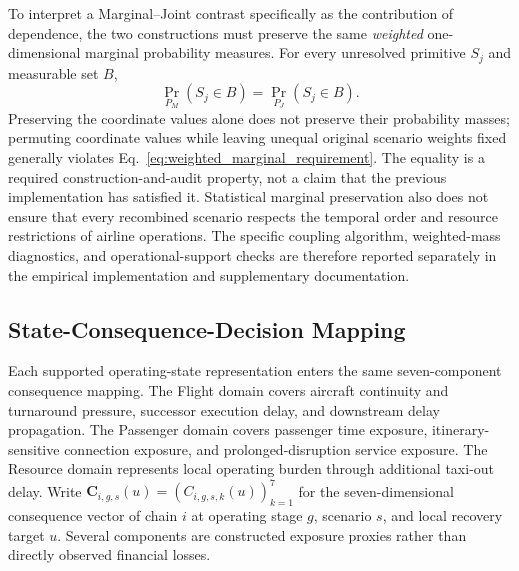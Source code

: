 To interpret a Marginal--Joint contrast specifically as the contribution of dependence, the two constructions must preserve the same \emph{weighted} one-dimensional marginal probability measures. For every unresolved primitive $S_j$ and measurable set $B$,
\begin{equation}
\Pr_{P_M}(S_j\in B)=\Pr_{P_J}(S_j\in B).
\label{eq:weighted_marginal_requirement}
\end{equation}
Preserving the coordinate values alone does not preserve their probability masses; permuting coordinate values while leaving unequal original scenario weights fixed generally violates Eq.~\eqref{eq:weighted_marginal_requirement}. The equality is a required construction-and-audit property, not a claim that the previous implementation has satisfied it. Statistical marginal preservation also does not ensure that every recombined scenario respects the temporal order and resource restrictions of airline operations. The specific coupling algorithm, weighted-mass diagnostics, and operational-support checks are therefore reported separately in the empirical implementation and supplementary documentation.

\subsection{State-Consequence-Decision Mapping}
\label{subsec:state_consequence_decision}

Each supported operating-state representation enters the same seven-component consequence mapping. The Flight domain covers aircraft continuity and turnaround pressure, successor execution delay, and downstream delay propagation. The Passenger domain covers passenger time exposure, itinerary-sensitive connection exposure, and prolonged-disruption service exposure. The Resource domain represents local operating burden through additional taxi-out delay. Write $\mathbf C_{i,g,s}(u)=(C_{i,g,s,k}(u))_{k=1}^{7}$ for the seven-dimensional consequence vector of chain $i$ at operating stage $g$, scenario $s$, and local recovery target $u$. Several components are constructed exposure proxies rather than directly observed financial losses.


